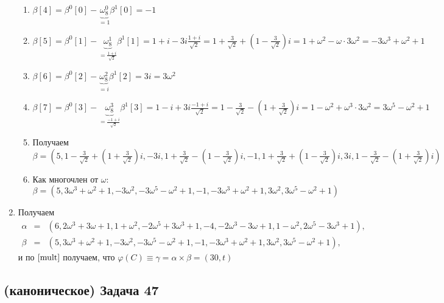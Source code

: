 \documentclass[a4paper]{article}
\begin{document}
\begin{enumerate}
\begin{enumerate}
\item $\beta[4]=\beta^0[0]-\underbrace{\omega_8^0}_{=1}\beta^1[0]=-1$
\item $\beta[5]=\beta^0[1]-\underbrace{\omega_8^1}_{=\frac{1+i}{\sqrt{2}}}\beta^1[1]=1+i-3i\frac{1+i}{\sqrt{2}}=1+\frac{3}{\sqrt{2}}+(1-\frac{3}{\sqrt{2}})i=1+\omega^2-\omega\cdot 3\omega^2=-3\omega^3+\omega^2+1$
\item $\beta[6]=\beta^0[2]-\underbrace{\omega_8^2}_{=i}\beta^1[2]=3i=3\omega^2$
\item $\beta[7]=\beta^0[3]-\underbrace{\omega_8^3}_{=\frac{-1+i}{\sqrt{2}}}\beta^1[3]=1-i+3i\frac{-1+i}{\sqrt{2}}=1-\frac{3}{\sqrt{2}}-(1+\frac{3}{\sqrt{2}})i=1-\omega^2+\omega^3\cdot 3\omega^2=3\omega^5-\omega^2+1$
\item Получаем $\beta=(5,1-\frac{3}{\sqrt{2}}+(1+\frac{3}{\sqrt{2}})i,-3i,1+\frac{3}{\sqrt{2}}-(1-\frac{3}{\sqrt{2}})i,-1,1+\frac{3}{\sqrt{2}}+(1-\frac{3}{\sqrt{2}})i,3i,1-\frac{3}{\sqrt{2}}-(1+\frac{3}{\sqrt{2}})i)$
\item Как многочлен от $\omega$: $\beta=(5,3\omega^3+\omega^2+1,-3\omega^2,-3\omega^5-\omega^2+1,-1,-3\omega^3+\omega^2+1,3\omega^2,3\omega^5-\omega^2+1)$
\end{enumerate}
\item Получаем
$$
\begin{array}{ccl}
\alpha&=&(6, 2\omega^3+3\omega+1, 1+\omega^2, -2\omega^5+3\omega^3+1, -4, -2\omega^3-3\omega+1,  1-\omega^2, 2\omega^5-3\omega^3+1),\\
\beta&=& (5, 3\omega^3+\omega^2+1,-3\omega^2, -3\omega^5-\omega^2+1,  -1, -3\omega^3+\omega^2+1, 3\omega^2,  3\omega^5-\omega^2+1),
\end{array}$$
и по $\ref{mult}$ получаем, что $\varphi(C)\equiv \gamma=\alpha\times\beta=(30,t)$
\end{enumerate}
\subsection*{(каноническое) Задача 47}
\end{document}
